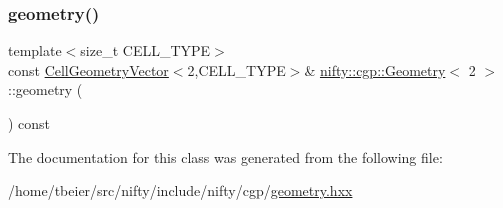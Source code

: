 \subsubsection{\texorpdfstring{geometry()}{geometry()}}
{\footnotesize\ttfamily template$<$size\+\_\+t C\+E\+L\+L\+\_\+\+T\+Y\+PE$>$ \\
const \hyperlink{classnifty_1_1cgp_1_1CellGeometryVector}{Cell\+Geometry\+Vector}$<$2,C\+E\+L\+L\+\_\+\+T\+Y\+PE$>$\& \hyperlink{classnifty_1_1cgp_1_1Geometry}{nifty\+::cgp\+::\+Geometry}$<$ 2 $>$\+::geometry (\begin{DoxyParamCaption}{ }\end{DoxyParamCaption}) const\hspace{0.3cm}{\ttfamily [inline]}}



The documentation for this class was generated from the following file\+:\begin{DoxyCompactItemize}
\item 
/home/tbeier/src/nifty/include/nifty/cgp/\hyperlink{geometry_8hxx}{geometry.\+hxx}\end{DoxyCompactItemize}
